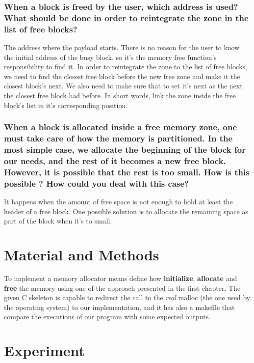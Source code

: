 \documentclass[11pt]{article}
\begin{document}
\subsubsection*{When a block is freed by the user, which address is used? What should be done in order to reintegrate the zone in the list of free blocks?}
The address where the payload starts. There is no reason for the user to know the initial address of the busy block, so it's the memory free function's responsibility to find it. 
In order to reintegrate the zone to the list of free blocks, we need to find the closest free block before the new free zone and make it the closest block's next. We also need to make sure that to set it's next as the next the closest free block had before. In short words, link the zone inside the free block's list in it's corresponding position.

\subsubsection*{When a block is allocated inside a free memory zone, one must take care of how the memory is partitioned. In the most simple case, we allocate the beginning of the block for our needs, and the rest of it becomes a new free block. However, it is possible that the rest is too small. How is this possible ? How could you deal with this case?}
It happens when the amount of free space is not enough to hold at least the header of a free block. One possible solution is to allocate the remaining space as part of the block when it's to small.

\section{Material and Methods}

To implement a memory allocator means define how \textbf{initialize}, \textbf{allocate} and \textbf{free} the memory using one of the approach presented in the first chapter. The given C skeleton is capable to redirect the call to the \textit{real} malloc (the one used by the operating system) to our implementation, and it has also a makefile that compare the executions of our program with some expected outputs.
 
\section{Experiment}
\end{document}
